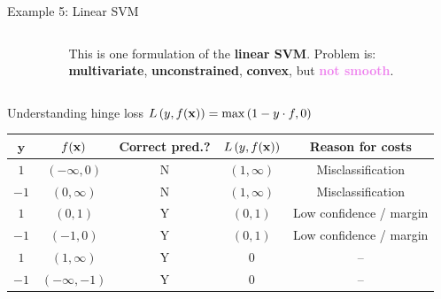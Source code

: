 \documentclass[11pt,compress,t,notes=noshow, xcolor=table]{beamer}
\begin{document}
\begin{vbframe}{Example 5: Linear SVM}
\begin{columns}[T]
\begin{column}{.3\textwidth}
\begin{figure}
\begin{center}
	\end{center}
		\end{figure}
	\end{column}
	\begin{column}{.3\textwidth}
	\vspace*{0.6cm}
	\begin{footnotesize}
	This is one formulation of the \textbf{linear SVM}. Problem is: \textbf{multivariate}, \textbf{unconstrained}, \textbf{convex}, but \textcolor{violet}{\textbf{not smooth}}.  
	\end{footnotesize}
	\end{column}
\end{columns}


\framebreak 

Understanding hinge loss $L\left(y, f(\mathbf{x})\right) = \max\left(1 - y\cdot f, 0\right)$

\begin{footnotesize}
\begin{center}
\begin{tabular}{ c | c | c | c | c }
$\mathbf{y}$ & $f(\mathbf{x})$ &  \textbf{Correct pred.?}  & $L\left(y, f(\mathbf{x})\right)$ & \textbf{Reason for costs}  \\ \hline
 $1$ & $(- \infty, 0)$  & N & $(1, \infty)$ & Misclassification \\
 $- 1$ & $(0, \infty)$ & N  & $(1, \infty)$ &  Misclassification \\
 $1$ & $(0, 1)$ & Y & $(0, 1)$ & Low confidence / margin \\
 $- 1$ & $(-1, 0)$  & Y  & $(0, 1)$& Low confidence / margin\\
 $1$ & $(1, \infty)$ &  Y & $0$ & -- \\
 $- 1$ & $(- \infty, -1)$ &  Y & $0$ & -- \\
\end{tabular}
\end{center}
\end{footnotesize}

\vspace*{-0.3cm}


\end{vbframe}
\end{document}
